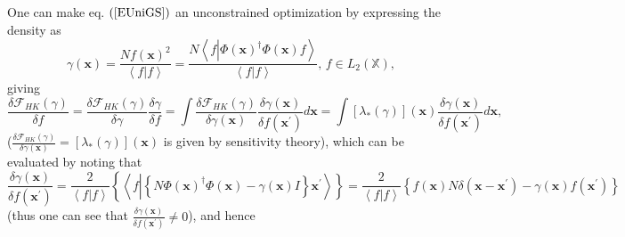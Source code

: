 \documentclass[aps,preprint]{revtex4}%
\begin{document}
One can make eq. $\left(  \ref{EUniGS}\right)  $ an unconstrained optimization
by expressing the density as
\begin{equation}
\gamma\left(  \mathbf{x}\right)  =\frac{Nf\left(  \mathbf{x}\right)  ^{2}%
}{\left\langle f|f\right\rangle }=\frac{N\left\langle f\left\vert \Phi\left(
\mathbf{x}\right)  ^{\dagger}\Phi\left(  \mathbf{x}\right)  f\right.
\right\rangle }{\left\langle f|f\right\rangle },\,f\in L_{2}\left(
\mathbb{X}\right)  ,
\end{equation}
giving%
\begin{equation}
\frac{\delta\mathcal{F}_{HK}\left(  \gamma\right)  }{\delta f}=\frac
{\delta\mathcal{F}_{HK}\left(  \gamma\right)  }{\delta\gamma}\frac
{\delta\gamma}{\delta f}=\int\frac{\delta\mathcal{F}_{HK}\left(
\gamma\right)  }{\delta\gamma\left(  \mathbf{x}\right)  }\frac{\delta
\gamma\left(  \mathbf{x}\right)  }{\delta f\left(  \mathbf{x}^{\prime}\right)
}d\mathbf{x}=\int\left[  \lambda_{\ast}\left(  \gamma\right)  \right]  \left(
\mathbf{x}\right)  \frac{\delta\gamma\left(  \mathbf{x}\right)  }{\delta
f\left(  \mathbf{x}^{\prime}\right)  }d\mathbf{x,}%
\end{equation}
($\frac{\delta\mathcal{F}_{HK}\left(  \gamma\right)  }{\delta\gamma\left(
\mathbf{x}\right)  }=\left[  \lambda_{\ast}\left(  \gamma\right)  \right]
\left(  \mathbf{x}\right)  $ is given by sensitivity theory), which can be
evaluated by noting that%
\begin{equation}
\frac{\delta\gamma\left(  \mathbf{x}\right)  }{\delta f\left(  \mathbf{x}%
^{\prime}\right)  }=\frac{2}{\left\langle f|f\right\rangle }\left\{
\left\langle f\left\vert \overset{}{\left\{  N\Phi\left(  \mathbf{x}\right)
^{\dagger}\Phi\left(  \mathbf{x}\right)  -\gamma\left(  \mathbf{x}\right)
I\right\}  }\right.  \mathbf{x}^{\prime}\right\rangle \right\}  =\frac
{2}{\left\langle f|f\right\rangle }\left\{  f\left(  \mathbf{x}\right)
N\delta\left(  \mathbf{x-x}^{\prime}\right)  -\gamma\left(  \mathbf{x}\right)
f\left(  \mathbf{x}^{\prime}\right)  \right\}
\end{equation}
(thus one can see that $\frac{\delta\gamma\left(  \mathbf{x}\right)  }{\delta
f\left(  \mathbf{x}^{\prime}\right)  }\neq0$), and hence
\end{document}
